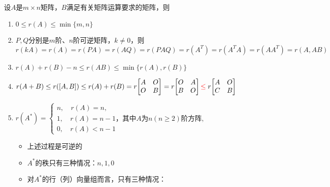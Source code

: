 \documentclass[./linear_algebra.tex]{subfiles}
\begin{document}
    设$A$是$m \times n$矩阵，$B$满足有关矩阵运算要求的矩阵，则
    \begin{enumerate}
        \item $0 \leq r(A) \leq \min\{m, n\}$
        \item $P, Q$分别是$m$阶、$n$阶可逆矩阵，$k \neq 0$，则
        \[
            r(kA) = r(A) = r(PA) = r(AQ) = r(PAQ) = r(A^T) = r(A^{T}A) = r(AA^{T}) = r(A, AB)
        \]
        \item $r(A) + r(B) - n \leq r(AB) \le \min\{r(A), r(B)\}$
        \item $r(A + B) \leq r([A, B]) \leq r(A) + r(B) = r\!\begin{bmatrix}
                                                                 A & O \\
                                                                 O & B
        \end{bmatrix} = r\!\begin{bmatrix}
                               O & A \\
                               B & O
        \end{bmatrix} {\color{red}{\leq}}\; r\!\begin{bmatrix}
                                  A & O \\
                                  C & B
        \end{bmatrix}$
        \item $r(A^*) = \begin{cases}
                            n, \quad r(A) = n, \\
                            1, \quad r(A) = n - 1\text{，其中}A\text{为}n(n\geq 2)\text{阶方阵}, \\
                            0, \quad r(A) < n - 1
        \end{cases}$
        \begin{itemize}
            \item 上述过程是可逆的
            \item $A^*$的秩只有三种情况：$n, 1, 0$
            \item 对$A^*$的行（列）向量组而言，只有三种情况：

\end{itemize}
\end{enumerate}
\end{document}
